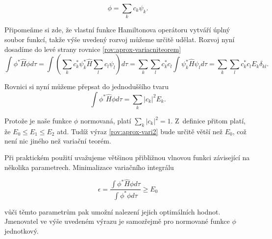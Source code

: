 \begin{equation}
\phi=\sum_k c_k \psi_k. 
\label{rov:aprox-rozvojbaze}
\end{equation}

\noindent Připomeňme si zde, že vlastní funkce Hamiltonova operátoru vytváří úplný soubor funkcí, takže výše uvedený rozvoj můžeme určitě udělat. Rozvoj nyní dosadíme do levé strany rovnice \ref{rov:aprox-variacniteorem}
\begin{equation}
\int\phi^*\hat{H}\phi d\tau=\int\left( \sum_k c_k^* \psi_k^*\hat{H}\sum_l c_l\psi_l\right)d\tau =\sum_k \sum_l c_k^*c_l\int\psi_k^*\hat{H}\psi_l d\tau=\sum_k \sum_l c_k^*c_lE_k\delta_{kl}.
\end{equation}

\noindent Rovnici si nyní můžeme přepsat do jednoduššího tvaru
\begin{equation}
\int\phi^*\hat{H}\phi d\tau=\sum_k |c_k|^2E_k.
\label{rov:aprox-vari2}
\end{equation}

\noindent Protože je naše funkce $ \phi $ normovaná, platí $\sum_k |c_k|^2=1 $. Z~definice přitom platí, že $E_0 \leq E_1 \leq E_2$ atd. Tudíž výraz \ref{rov:aprox-vari2} bude určitě větší než $ E_0 $, což není nic jiného než variační teorém.

Při praktickém použití uvažujeme většinou  přibližnou vlnovou funkci závisející na několika parametrech. Minimalizace variačního integrálu

\begin{equation}
\epsilon=\frac{\int\phi^*\hat{H}\phi d\tau}{\int\phi^*\phi d\tau}\geq E_0
\label{rov:aprox-variacniintegrál}
\end{equation}

\noindent vůči těmto parametrům pak umožní nalezení jejich optimálních hodnot. Jmenovatel ve výše uvedeném výrazu je samozřejmě pro normované funkce $ \phi $ jednotkový.

